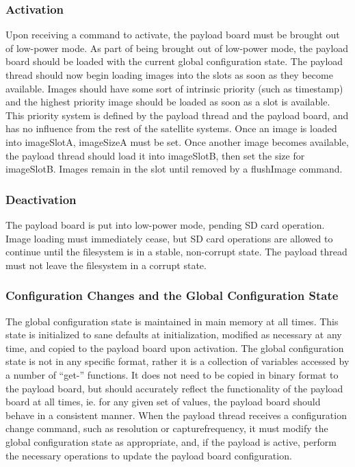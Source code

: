 \documentclass{article}
\begin{document}
\subsubsection{Activation}
Upon receiving a command to activate, the payload board must
be brought out of low-power mode. As part of being brought out of low-power
mode, the payload board should be loaded with the current global configuration
state. The payload thread should now begin loading 
images into the slots as soon as they become available. Images should have some
sort of intrinsic priority (such as timestamp) and the highest priority image
should be loaded as soon as a slot is available. This priority system is defined
by the payload thread and the payload board, and has no influence from the
rest of the satellite systems. Once an image is loaded into
imageSlotA, imageSizeA must be set. Once another image becomes available, 
the payload thread should load it into imageSlotB, then set the size for
imageSlotB. Images remain in the slot until removed by a flushImage command.

\subsubsection{Deactivation}
The payload board is put into low-power mode, pending SD card operation. 
Image loading must immediately cease, but SD card operations are allowed to
continue until the filesystem is in a stable, non-corrupt state. The
payload thread must not leave the filesystem in a corrupt state.

\subsubsection{Configuration Changes and the Global Configuration State}
The global configuration state is maintained in main memory at all times. 
This state is initialized to sane
defaults at initialization, modified as necessary at any time, and copied
to the payload board upon activation. 
The global configuration state is not in any specific format, rather it is
a collection of variables accessed by a number of ``get-'' functions. It does
not need to be copied in binary format to the payload board, but should
accurately reflect the functionality of the payload board at all times, ie. for
any given set of values, the payload board should behave in a consistent manner.
When the payload thread receives a configuration change command, such as resolution
or capturefrequency, it must modify the global configuration state as
appropriate, and, if the payload is active, perform the necessary operations
to update the payload board configuration.
\end{document}
